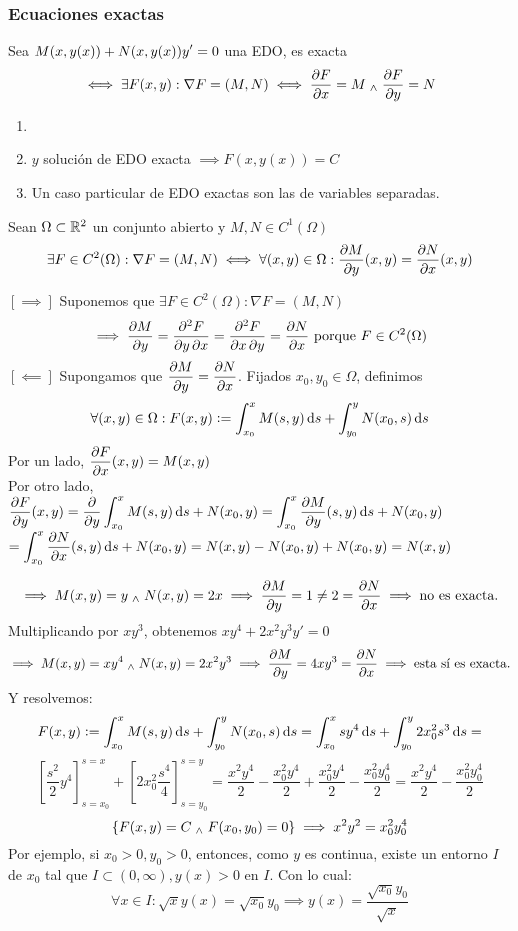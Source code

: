 \subsubsection{Ecuaciones exactas}
\begin{defn}
	Sea $\displaystyle M(x, y(x))+N(x, y(x))y'=0$ una EDO, es exacta
	\[\iff \exists F(x, y) : \nabla F=(M, N) \iff \pdv{F}{x}=M \; _{\wedge} \; \pdv{F}{y}=N\] 
\end{defn}
\begin{obs}
	\begin{enumerate}[topsep=0pt, itemsep=1pt,parsep=3pt]
		\item[] 
		\item $y$ solución de EDO exacta $\implies F(x, y(x))=C$
		\item Un caso particular de EDO exactas son las de variables separadas.
	\end{enumerate}
\end{obs}

\begin{prop}
	Sean $\Omega\subset \mathbb{R}^2$ un conjunto abierto y $M, N \in C^1(\Omega)$
	\[\exists F \in C^2(\Omega) : \nabla F=(M,N) \iff \forall (x,y) \in \Omega :\pdv{M}{y}(x,y)=\pdv{N}{x}(x,y)\]
	\begin{dem}
		$[\implies]$ Suponemos que $\exists F \in C^2(\Omega):\nabla F = (M, N)$
		\[\implies \pdv{M}{y}=\pdv{F}{y, x}=\pdv{F}{x, y}=\pdv{N}{x} \text{ porque } F \in C^2(\Omega) \]
		$[\impliedby]$ Supongamos que $\displaystyle\pdv{M}{y}=\pdv{N}{x}$. Fijados $x_0, y_0 \in \Omega$, definimos
		\[\forall (x, y) \in \Omega : F(x, y)\defeq \int_{x_0}^xM(s,y)\odif{s}+ \int_{y_0}^yN(x_0,s)\odif{s}\]
		Por un lado, $\displaystyle \pdv{F}{x}(x,y)=M(x,y)$ \\
		Por otro lado, $\ds \pdv{F}{y}(x, y)=\pdv{}{y} \int_{x_0}^x M(s,y) \odif{s} + N(x_0, y) = \int_{x_0}^x \pdv{M}{y}(s,y)\odif{s} + N(x_0, y)$
		$\ds= \int_{x_0}^x \pdv{N}{x}(s,y)\odif{s} + N(x_0, y)=N(x,y)-N(x_0, y)+ N(x_0, y)=N(x,y)$
	\end{dem}
\end{prop}

\begin{ejem}[$y+2xy'=0$]
	\[\implies M(x, y)=y \; _{\wedge} \; N(x,y) = 2x \implies \pdv{M}{y}=1 \ne 2 = \pdv{N}{x} \implies \text{no es exacta.}\]
	Multiplicando por $xy^3$, obtenemos $xy^4+2x^2y^3y'=0$
	\[\implies M(x, y)=xy^4 \; _{\wedge} \; N(x,y)=2x^2y^3 \implies \pdv{M}{y}=4xy^3 = \pdv{N}{x}\implies \text{esta sí es exacta.}\]
	Y resolvemos:
	\[F(x, y)\defeq \int_{x_0}^xM(s,y)\odif{s}+\int_{y_0}^yN(x_0,s)\odif{s} = \int_{x_0}^xsy^4\odif{s}+\int_{y_0}^y2x_0^2s^3\odif{s}=\]
	\[\left[\frac{s^2}{2}y^4\right]_{s=x_0}^{s=x} + \left[2x_0^2\frac{s^4}{4}\right]_{s=y_0}^{s=y}=\frac{x^2y^4}{2}-\frac{x_0^2y^4}{2}+\frac{x_0^2y^4}{2}-\frac{x_0^2y_0^4}{2}=\frac{x^2y^4}{2}-\frac{x_0^2y_0^4}{2}\]
	\[\{F(x,y)=C \; _{\wedge} \; F(x_0, y_0)=0\} \implies x^2y^2=x_0^2y_0^4\]
	Por ejemplo, si $x_0>0, y_0>0$, entonces, como $y$ es continua, existe un entorno $I$ de $x_0$ tal que $I\subset (0, \infty), y(x)>0$ en $I$. Con lo cual:
	\[\forall x \in I : \sqrt{x}y(x)=\sqrt{x_0}y_0 \implies \boxed{y(x)=\frac{\sqrt{x_0}y_0}{\sqrt{x}}}\]
\end{ejem}

